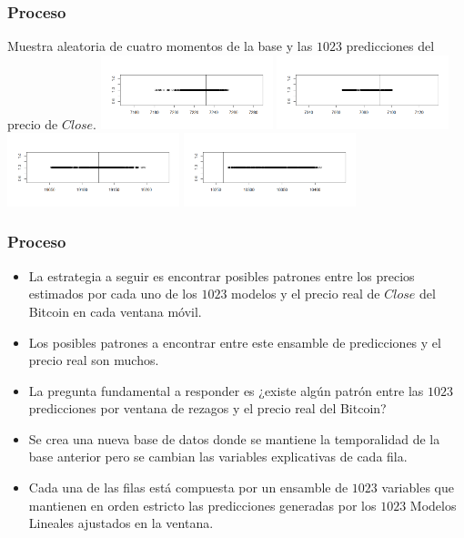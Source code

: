 \documentclass{beamer}
\begin{document}
\begin{frame}[t]
\frametitle{Proceso}
\vfill
Muestra aleatoria de cuatro momentos de la base y las $1023$ predicciones del precio de $Close$.
\vfill
\centering
\includegraphics[width=5.0cm]{muestra1}
\includegraphics[width=5.0cm]{muestra2}
\includegraphics[width=5.0cm]{muestra3}
\includegraphics[width=5.0cm]{muestra4}
\end{frame}

\begin{frame}[t]
\frametitle{Proceso}
\vfill
\begin{itemize}
\item
La estrategia a seguir es  encontrar posibles patrones entre los precios estimados por cada uno de los $1023$ modelos y el precio real de $Close$ del Bitcoin en cada ventana móvil. 
\item
Los posibles patrones a encontrar entre este ensamble de predicciones y el precio real son muchos.
\item
La pregunta fundamental a responder es ¿existe algún patrón entre las $1023$ predicciones por ventana de rezagos y el precio real del Bitcoin?
\item
Se crea una nueva base de datos donde se mantiene la temporalidad de la base anterior pero se cambian las variables explicativas de cada fila. 
\item
Cada una de las filas está compuesta por un ensamble de $1023$ variables que mantienen en orden estricto las predicciones generadas por los $1023$ Modelos Lineales ajustados en la ventana.
\end{itemize}
\vfill
\end{frame}
\end{document}
